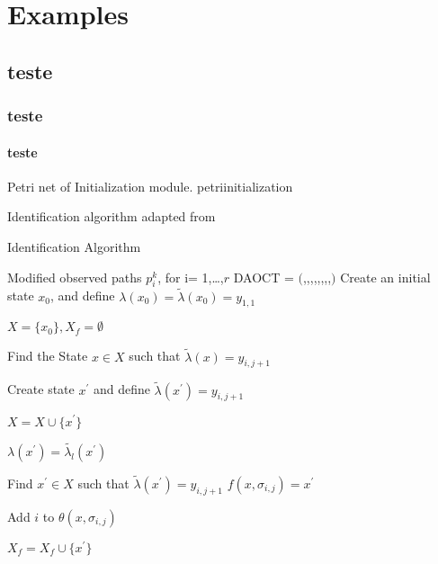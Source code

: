 
\chapter{Examples}
\label{chap:examples}

\section{teste}
\subsection{teste}
\subsubsection{teste}




{Petri net of Initialization module.}
{petriinitialization}



Identification algorithm adapted from \cite{moreira2018enhanced}
\begin{algorithm2e}
  \caption{Identification Algorithm}\label{alg:identification}
\KwIn
{%
Modified observed paths $p_i^k$, for i= 1,\dots,$r$
}
\KwOut
{%
DAOCT = $($\XSet,\SigmaSet,\OmegaSet,\ffunction,\lambdafunction,\RSet,\thetafunction,\xZero,\XfSet$)$
}
\BlankLine
Create an initial state $x_0$, and define $\lambda(x_0) = \tilde{\lambda}(x_0) =
y_{1,1}$

$X = \{ x_0\}, X_f = \emptyset$

{
{
  Find the State $x \in X $ such that $\tilde{\lambda}(x) = y_{i,j+1}$

  { Create state $x^\prime$ and define $\tilde{\lambda}(x^\prime) = y_{i,j+1}$

$X = X \cup \{ x^\prime\}$

$\lambda(x^\prime) = \tilde{\lambda_l}(x^\prime)$

}
{
  Find $x^\prime \in X$ such that $\tilde{\lambda}(x^\prime) = y_{i,j+1}$
}
$f(x,\sigma_{i,j}) = x^\prime$

Add $i$ to $\theta(x,\sigma_{i,j})$

{
  $X_f = X_f \cup \{x^\prime\}$
}
}
}
\end{algorithm2e}

